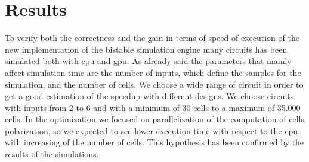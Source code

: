 \chapter{Results}\label{sec:results}
To verify both the correctness and the gain in terms of speed of execution of the new implementation of the bistable simulation engine many circuits has been simulated both with cpu and gpu.
As already said the parameters that mainly affect simulation time are the number of inputs, which define the samples for the simulation, and the number of cells. We choose a wide range of circuit in order to get a good estimation of the speedup with different designs. We choose circuits with inputs from 2 to 6 and with a minimum of 30 cells to a maximum of 35.000 cells. \newline
In the optimization we focused on parallelization of the computation of cells polarization, so we expected to see lower execution time with respect to the cpu with increasing of the number of cells. This hypothesis has been confirmed by the results of the simulations.

